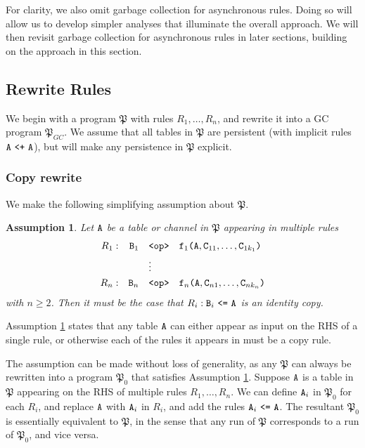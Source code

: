 \documentclass{article}
\numberwithin{equation}{section}
\newtheorem{assumption}[property]{Assumption}
\renewcommand{\tt}[1]{\ifmmode\text{\texttt{#1}}\else\texttt{#1}\fi}
\begin{document}
For clarity, we also omit garbage collection for asynchronous rules.
Doing so will allow us to develop simpler analyses that illuminate the overall approach.
We will then revisit garbage collection for asynchronous rules in later sections, building on the approach in this section.

\subsection{Rewrite Rules}
We begin with a program $\mathfrak{P}$ with rules $R_1, \dots, R_n$, and rewrite it into a GC program $\mathfrak{P}_{GC}$.
We assume that all tables in $\mathfrak{P}$ are persistent (with implicit rules $\tt{A} ~\tt{<+}~ \tt{A}$), but will make any persistence in $\mathfrak{P}$ explicit.

\setcounter{subsubsection}{-1}

\subsubsection{Copy rewrite}
We make the following simplifying assumption about $\mathfrak{P}$.
\begin{assumption}
\label{ass:copy}
Let $\tt{A}$ be a table or channel in $\mathfrak{P}$ appearing in multiple rules
\begin{align*}
R_1: && \tt{B}_1 &\quad\tt{<op>}\quad \tt{f}_1\tt{(}\tt{A},\tt{C}_{11},\dots,\tt{C}_{1k_1}\tt{)}\\
&&&\quad\vdots\\
R_n: && \tt{B}_n &\quad\tt{<op>}\quad \tt{f}_n\tt{(}\tt{A},\tt{C}_{n1},\dots,\tt{C}_{nk_n}\tt{)}
\end{align*}
with $n \geq 2$.
Then it must be the case that $R_i: \tt{B}_i ~\tt{<=}~ \tt{A}$ is an identity copy.
\end{assumption}
Assumption \ref{ass:copy} states that any table $\tt{A}$ can either appear as input on the RHS of a single rule, or otherwise each of the rules it appears in must be a copy rule.

The assumption can be made without loss of generality, as any $\mathfrak{P}$ can always be rewritten into a program $\mathfrak{P}_0$ that satisfies Assumption \ref{ass:copy}.
Suppose $\tt{A}$ is a table in $\mathfrak{P}$ appearing on the RHS of multiple rules $R_1,\dots,R_n$.
We can define $\tt{A}_i$ in $\mathfrak{P}_0$ for each $R_i$, and replace $\tt{A}$ with $\tt{A}_i$ in $R_i$, and add the rules $\tt{A}_i ~\tt{<=}~ \tt{A}$.
The resultant $\mathfrak{P}_0$ is essentially equivalent to $\mathfrak{P}$, in the sense that any run of $\mathfrak{P}$ corresponds to a run of $\mathfrak{P}_0$, and vice versa.
\end{document}
